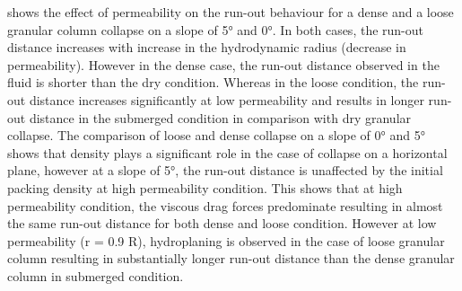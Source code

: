  shows the effect of permeability on the 
run-out behaviour for a dense and a loose granular column collapse on a slope 
of 5\si{\degree} and 0\si{\degree}. In both cases, the run-out distance 
increases with increase in the hydrodynamic radius (decrease in permeability). 
However in the dense case, the run-out distance observed in the fluid is 
shorter than the dry condition. Whereas in the loose condition, the run-out 
distance increases significantly at low permeability and results in longer 
run-out distance in the submerged condition in comparison with dry granular 
collapse. The comparison of loose and dense collapse on a slope of 
0\si{\degree} and 5\si{\degree} shows that density plays a significant role in 
the case of collapse on a horizontal plane, however at a slope of 
5\si{\degree}, the run-out distance is unaffected by the initial packing 
density at high permeability condition. This shows that at high permeability 
condition, the viscous drag forces predominate resulting in almost the same 
run-out distance for both dense and loose condition. However at low 
permeability (r = 0.9 R), hydroplaning is observed in the case of loose 
granular column resulting in substantially longer run-out distance than the 
dense granular column in submerged condition. 
